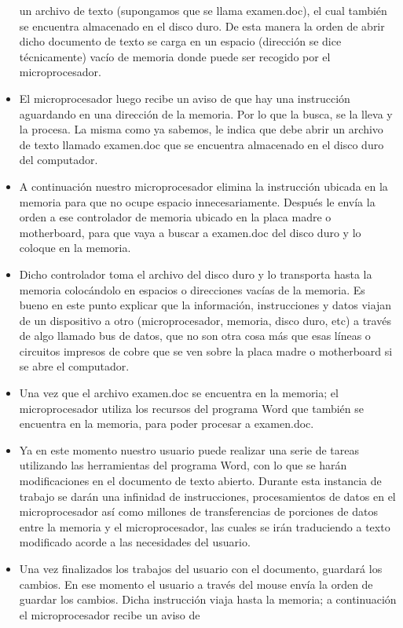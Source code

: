 \documentclass{article}
\begin{document}
\begin{itemize}
un archivo de texto (supongamos que se llama examen.doc), el cual también se encuentra
almacenado en el disco duro. De esta manera la orden de abrir dicho documento de texto se
carga en un espacio (dirección se dice técnicamente) vacío de memoria donde puede ser
recogido por el microprocesador.
\item El microprocesador luego recibe un aviso de que hay una instrucción aguardando en una
dirección de la memoria. Por lo que la busca, se la lleva y la procesa. La misma como ya
sabemos, le indica que debe abrir un archivo de texto llamado examen.doc que se encuentra
almacenado en el disco duro del computador.
\item A continuación nuestro microprocesador elimina la instrucción ubicada en la memoria para
que no ocupe espacio innecesariamente. Después le envía la orden a ese controlador de
memoria ubicado en la placa madre o motherboard, para que vaya a buscar
a examen.doc del disco duro y lo coloque en la memoria.
\item Dicho controlador toma el archivo del disco duro y lo transporta hasta la memoria
colocándolo en espacios o direcciones vacías de la memoria. Es bueno en este punto explicar
que la información, instrucciones y datos viajan de un dispositivo a otro (microprocesador,
memoria, disco duro, etc) a través de algo llamado bus de datos, que no son otra cosa más
que esas líneas o circuitos impresos de cobre que se ven sobre la placa madre o
motherboard si se abre el computador.
\item Una vez que el archivo examen.doc se encuentra en la memoria; el microprocesador utiliza
los recursos del programa Word que también se encuentra en la memoria, para poder
procesar a examen.doc.
\item Ya en este momento nuestro usuario puede realizar una serie de tareas utilizando las
herramientas del programa Word, con lo que se harán modificaciones en el documento de
texto abierto. Durante esta instancia de trabajo se darán una infinidad de instrucciones,
procesamientos de datos en el microprocesador así como millones de transferencias de
porciones de datos entre la memoria y el microprocesador, las cuales se irán traduciendo a
texto modificado acorde a las necesidades del usuario.
\item Una vez finalizados los trabajos del usuario con el documento, guardará los cambios. En ese
momento el usuario a través del mouse envía la orden de guardar los cambios. Dicha
instrucción viaja hasta la memoria; a continuación el microprocesador recibe un aviso de

\end{itemize}
\end{document}
